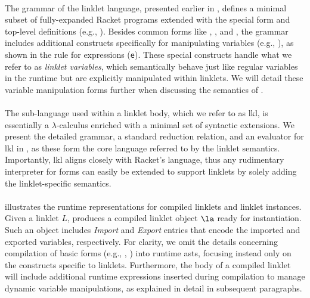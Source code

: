 		\paragraph{}%
			The grammar of the linklet language, presented earlier in , defines a minimal subset of fully-expanded Racket programs extended with the special  form and top-level definitions (e.g., ). Besides common forms like , , and , the grammar includes additional constructs specifically for manipulating variables (e.g., ), as shown in the rule for expressions (\verb|e|). These special constructs handle what we refer to as \emph{linklet variables}, which semantically behave just like regular variables in the runtime but are explicitly manipulated within linklets. We will detail these variable manipulation forms further when discussing the semantics of .

		\paragraph{}%
			The sub-language used within a linklet body, which we refer to as \gls{lkl}, is essentially a $\lambda$-calculus enriched with a minimal set of syntactic extensions. We present the detailed grammar, a standard reduction relation, and an evaluator for \gls{lkl} in , as these form the core language referred to by the linklet semantics. Importantly, \gls{lkl} aligns closely with Racket's  language, thus any rudimentary interpreter for  forms can easily be extended to support linklets by solely adding the linklet-specific semantics.


		\paragraph{}%
			 illustrates the runtime representations for compiled linklets and linklet instances. Given a linklet $L$,  produces a compiled linklet object $\la$ ready for instantiation. Such an object includes \emph{Import} and \emph{Export} entries that encode the imported and exported variables, respectively. For clarity, we omit the details concerning compilation of basic forms (e.g., , ) into runtime \glspl{ast}, focusing instead only on the constructs specific to linklets. Furthermore, the body of a compiled linklet will include additional runtime expressions inserted during compilation to manage dynamic variable manipulations, as explained in detail in subsequent paragraphs.

